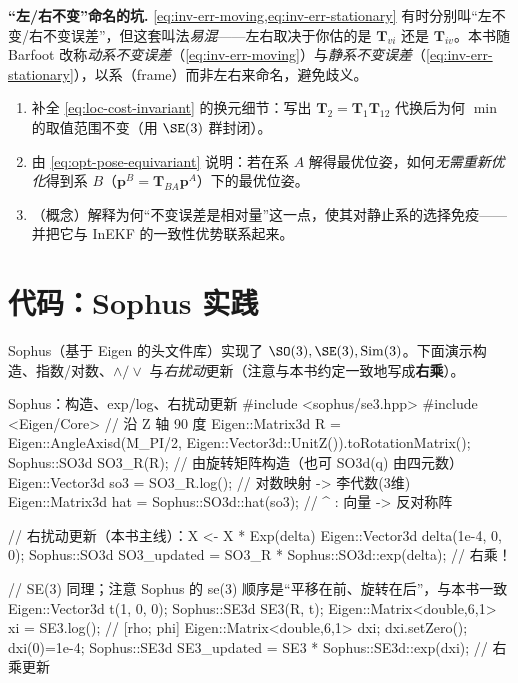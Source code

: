 \begin{note}
\textbf{“左/右不变”命名的坑.}\;
\cref{eq:inv-err-moving,eq:inv-err-stationary} 有时分别叫“左不变/右不变误差”，但这套叫法\emph{易混}——左右取决于你估的是 $\mathbf{T}_{vi}$ 还是 $\mathbf{T}_{iv}$。本书随 Barfoot\cite{barfoot2024state} 改称\emph{动系不变误差}（\cref{eq:inv-err-moving}）与\emph{静系不变误差}（\cref{eq:inv-err-stationary}），以系（frame）而非左右来命名，避免歧义。
\end{note}

\begin{practice}
\begin{enumerate}
  \item 补全 \cref{eq:loc-cost-invariant} 的换元细节：写出 $\mathbf{T}_2=\mathbf{T}_1\mathbf{T}_{12}$ 代换后为何 $\min$ 的取值范围不变（用 $\SE(3)$ 群封闭）。
  \item 由 \cref{eq:opt-pose-equivariant} 说明：若在系 $A$ 解得最优位姿，如何\emph{无需重新优化}得到系 $B$（$\mathbf{p}^B=\mathbf{T}_{BA}\mathbf{p}^A$）下的最优位姿。
  \item （概念）解释为何“不变误差是相对量”这一点，使其对静止系的选择免疫——并把它与 InEKF 的一致性优势联系起来。
\end{enumerate}
\end{practice}

\section{代码：Sophus 实践}
\label{sec:sophus}

Sophus（基于 Eigen 的头文件库）实现了 $\SO(3),\SE(3),\mathrm{Sim}(3)$。下面演示构造、指数/对数、$\wedge/\vee$ 与\emph{右扰动}更新（注意与本书约定一致地写成\textbf{右乘}）。

\begin{codebox}[C++]{Sophus：构造、exp/log、右扰动更新}
#include <sophus/se3.hpp>
#include <Eigen/Core>
// 沿 Z 轴 90 度
Eigen::Matrix3d R = Eigen::AngleAxisd(M_PI/2, Eigen::Vector3d::UnitZ()).toRotationMatrix();
Sophus::SO3d SO3_R(R);                 // 由旋转矩阵构造（也可 SO3d(q) 由四元数）
Eigen::Vector3d so3 = SO3_R.log();     // 对数映射 -> 李代数(3维)
Eigen::Matrix3d hat = Sophus::SO3d::hat(so3);   // ^ : 向量 -> 反对称阵

// 右扰动更新（本书主线）：X <- X * Exp(delta)
Eigen::Vector3d delta(1e-4, 0, 0);
Sophus::SO3d SO3_updated = SO3_R * Sophus::SO3d::exp(delta);   // 右乘！

// SE(3) 同理；注意 Sophus 的 se(3) 顺序是“平移在前、旋转在后”，与本书一致
Eigen::Vector3d t(1, 0, 0);
Sophus::SE3d SE3(R, t);
Eigen::Matrix<double,6,1> xi = SE3.log();        // [rho; phi]
Eigen::Matrix<double,6,1> dxi; dxi.setZero(); dxi(0)=1e-4;
Sophus::SE3d SE3_updated = SE3 * Sophus::SE3d::exp(dxi);       // 右乘更新
\end{codebox}

